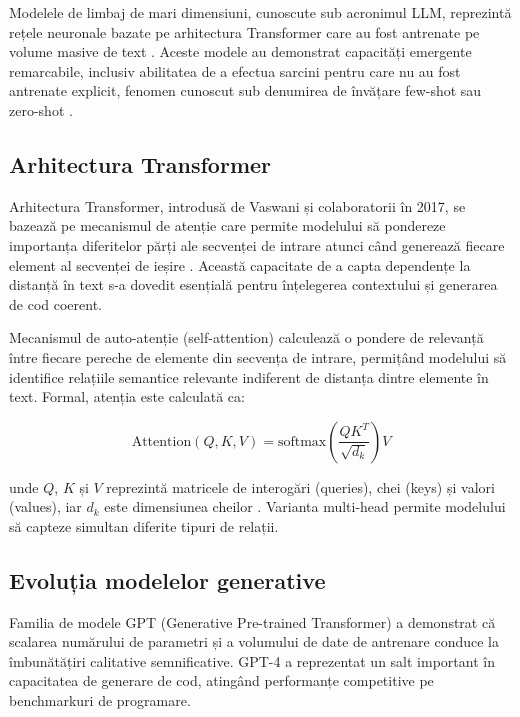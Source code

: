 \documentclass[12pt, a4paper]{report}
\begin{document}
Modelele de limbaj de mari dimensiuni, cunoscute sub acronimul LLM, reprezintă rețele neuronale bazate pe arhitectura Transformer care au fost antrenate pe volume masive de text \cite{attention}. Aceste modele au demonstrat capacități emergente remarcabile, inclusiv abilitatea de a efectua sarcini pentru care nu au fost antrenate explicit, fenomen cunoscut sub denumirea de învățare few-shot sau zero-shot \cite{gpt3}.

\subsection{Arhitectura Transformer}

Arhitectura Transformer, introdusă de Vaswani și colaboratorii în 2017, se bazează pe mecanismul de atenție care permite modelului să pondereze importanța diferitelor părți ale secvenței de intrare atunci când generează fiecare element al secvenței de ieșire \cite{attention}. Această capacitate de a capta dependențe la distanță în text s-a dovedit esențială pentru înțelegerea contextului și generarea de cod coerent.

Mecanismul de auto-atenție (self-attention) calculează o pondere de relevanță între fiecare pereche de elemente din secvența de intrare, permițând modelului să identifice relațiile semantice relevante indiferent de distanța dintre elemente în text. Formal, atenția este calculată ca:

\begin{equation}
\text{Attention}(Q, K, V) = \text{softmax}\left(\frac{QK^T}{\sqrt{d_k}}\right)V
\label{eq:attention}
\end{equation}

\noindent unde $Q$, $K$ și $V$ reprezintă matricele de interogări (queries), chei (keys) și valori (values), iar $d_k$ este dimensiunea cheilor \cite{attention}. Varianta multi-head permite modelului să capteze simultan diferite tipuri de relații.

\subsection{Evoluția modelelor generative}

Familia de modele GPT (Generative Pre-trained Transformer) \cite{gpt3} a demonstrat că scalarea numărului de parametri și a volumului de date de antrenare conduce la îmbunătățiri calitative semnificative. GPT-4 \cite{gpt4} a reprezentat un salt important în capacitatea de generare de cod, atingând performanțe competitive pe benchmarkuri de programare.
\end{document}
